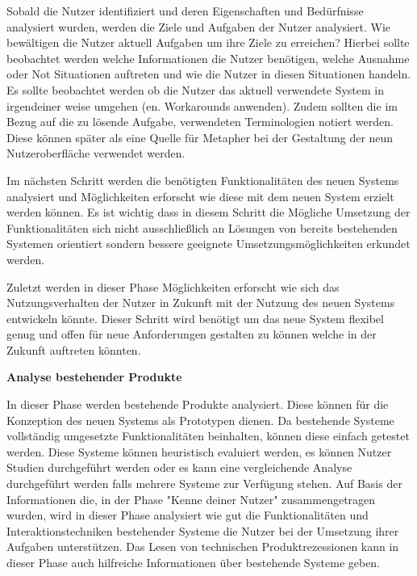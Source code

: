 Sobald die Nutzer identifiziert und deren Eigenschaften und Bedürfnisse analysiert wurden, werden die Ziele und Aufgaben der Nutzer analysiert. Wie bewältigen die Nutzer aktuell Aufgaben um 
ihre Ziele zu erreichen? Hierbei sollte beobachtet werden welche Informationen die Nutzer benötigen, welche Ausnahme oder Not Situationen  auftreten und wie die Nutzer in diesen Situationen handeln. 
Es sollte beobachtet werden ob die Nutzer das aktuell verwendete System in irgendeiner weise umgehen (en. Workarounds anwenden). Zudem sollten die im Bezug auf die zu lösende Aufgabe, verwendeten 
Terminologien notiert werden. Diese können später als eine Quelle für Metapher bei der Gestaltung der neun Nutzeroberfläche verwendet werden. 

Im nächsten Schritt werden die benötigten Funktionalitäten des neuen Systems analysiert und Möglichkeiten erforscht wie diese mit dem neuen System erzielt werden können. 
Es ist wichtig dass in diesem Schritt die Mögliche Umsetzung der Funktionalitäten sich nicht ausschließlich an Lösungen von bereits bestehenden Systemen orientiert sondern 
bessere geeignete Umsetzungsmöglichkeiten erkundet werden.

Zuletzt werden in dieser Phase Möglichkeiten erforscht wie sich das Nutzungsverhalten der Nutzer in Zukunft mit der Nutzung des neuen Systems entwickeln könnte. Dieser Schritt wird  
benötigt um das neue System flexibel genug und offen für neue Anforderungen  gestalten zu können welche in der Zukunft auftreten könnten. %

\vspace{10mm}
\textbf{Analyse bestehender Produkte} 
 
In dieser Phase werden bestehende Produkte analysiert. Diese können für die Konzeption des neuen Systems als Prototypen dienen. Da bestehende Systeme vollständig 
umgesetzte Funktionalitäten beinhalten, können diese einfach getestet werden.    
Diese Systeme können heuristisch evaluiert werden, es können Nutzer Studien durchgeführt werden oder es kann eine vergleichende Analyse durchgeführt werden falls mehrere Systeme zur 
Verfügung stehen. Auf Basis der Informationen die, in der Phase "Kenne deiner Nutzer" zusammengetragen wurden, wird in dieser Phase analysiert wie gut die  Funktionalitäten und Interaktionstechniken 
bestehender Systeme die Nutzer bei der Umsetzung ihrer Aufgaben unterstützen. Das Lesen von technischen Produktrezessionen kann in dieser Phase auch hilfreiche Informationen über bestehende Systeme geben. 

